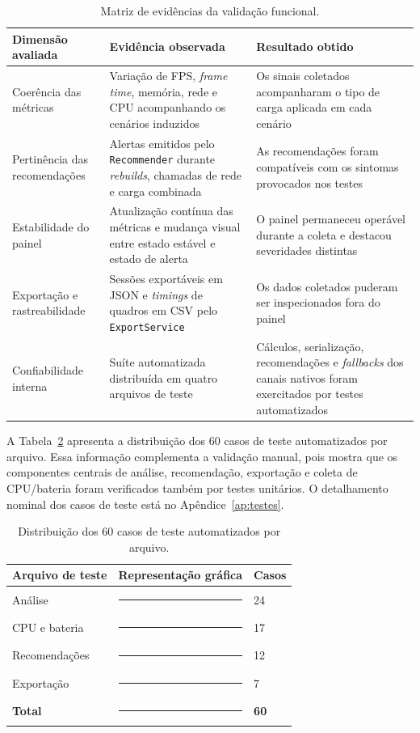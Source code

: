\begin{table}[H]
\centering
\caption{Matriz de evidências da validação funcional.}
\label{tab:matriz-evidencias}
\small
\renewcommand{\arraystretch}{1.3}
\begin{tabular}{|p{3.6cm}|p{5.4cm}|p{5.2cm}|}
\hline
\textbf{Dimensão avaliada} & \textbf{Evidência observada} & \textbf{Resultado obtido} \\
\hline
Coerência das métricas & Variação de FPS, \textit{frame time}, memória, rede e CPU acompanhando os cenários induzidos & Os sinais coletados acompanharam o tipo de carga aplicada em cada cenário \\
\hline
Pertinência das recomendações & Alertas emitidos pelo \texttt{Recommender} durante \textit{rebuilds}, chamadas de rede e carga combinada & As recomendações foram compatíveis com os sintomas provocados nos testes \\
\hline
Estabilidade do painel & Atualização contínua das métricas e mudança visual entre estado estável e estado de alerta & O painel permaneceu operável durante a coleta e destacou severidades distintas \\
\hline
Exportação e rastreabilidade & Sessões exportáveis em JSON e \textit{timings} de quadros em CSV pelo \texttt{ExportService} & Os dados coletados puderam ser inspecionados fora do painel \\
\hline
Confiabilidade interna & Suíte automatizada distribuída em quatro arquivos de teste & Cálculos, serialização, recomendações e \textit{fallbacks} dos canais nativos foram exercitados por testes automatizados \\
\hline
\end{tabular}
\end{table}

A Tabela~\ref{tab:distribuicao-testes} apresenta a distribuição dos 60 casos de teste automatizados por arquivo. Essa informação complementa a validação manual, pois mostra que os componentes centrais de análise, recomendação, exportação e coleta de CPU/bateria foram verificados também por testes unitários. O detalhamento nominal dos casos de teste está no Apêndice~\ref{ap:testes}.

\begin{table}[H]
\centering
\caption{Distribuição dos 60 casos de teste automatizados por arquivo.}
\label{tab:distribuicao-testes}
\small
\renewcommand{\arraystretch}{1.25}
\begin{tabular}{|p{4.4cm}|p{7.2cm}|p{1.8cm}|}
\hline
\textbf{Arquivo de teste} & \textbf{Representação gráfica} & \textbf{Casos} \\
\hline
Análise & \rule{6.0cm}{0.45em} & 24 \\
\hline
CPU e bateria & \rule{4.25cm}{0.45em} & 17 \\
\hline
Recomendações & \rule{3.0cm}{0.45em} & 12 \\
\hline
Exportação & \rule{1.75cm}{0.45em} & 7 \\
\hline
\textbf{Total} & \rule{6.0cm}{0.45em} & \textbf{60} \\
\hline
\end{tabular}
\end{table}

